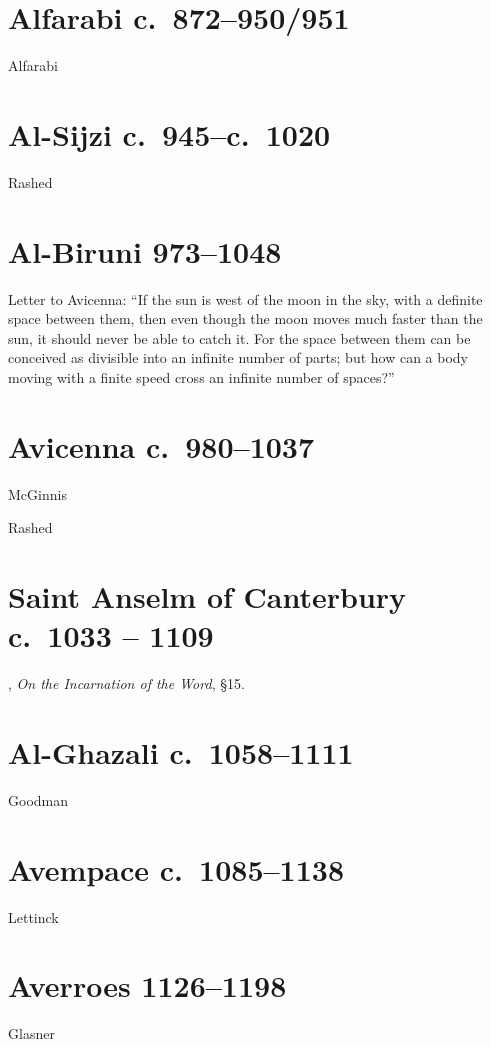 \documentclass{amsart}
\theoremstyle{definition}
\begin{document}
\section{Alfarabi c.~872--950/951}
Alfarabi \cite[pp.~101--111]{alfarabi}


\section{Al-Sijzi c.~945--c.~1020}
Rashed \cite{rashed2000}

\section{Al-Biruni 973--1048}
Letter to Avicenna: ``If the sun is west of the moon in the sky, with a definite space between
them, then even though the moon moves much faster than the sun, it should never be able to catch it.
For the space between them can be conceived as divisible into an infinite number of parts; but how
can a body moving with a finite speed cross an infinite number of spaces?'' \cite[p.~820]{selin}

\section{Avicenna c.~980--1037}
McGinnis \cite{mcginnis}

Rashed \cite{rashed}



\section{Saint Anselm of Canterbury c.~1033 -- 1109},
{\em On the Incarnation of the Word}, \S 15.


\section{Al-Ghazali c.~1058--1111}
Goodman \cite{goodman}


\section{Avempace c.~1085--1138}
Lettinck \cite{lettinck}



\section{Averroes 1126--1198}
Glasner \cite{glasner}
\end{document}
